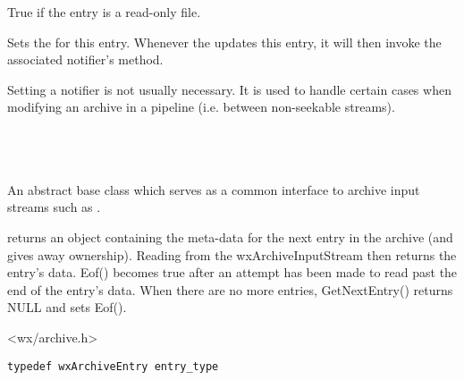 True if the entry is a read-only file.


\label{wxarchiveentrynotifier}



Sets the  for this entry.
Whenever the  updates
this entry, it will then invoke the associated
notifier's 
method.

Setting a notifier is not usually necessary. It is used to handle
certain cases when modifying an archive in a pipeline (i.e. between
non-seekable streams).


\\


%
%

\section{}\label{wxarchiveinputstream}

An abstract base class which serves as a common interface to
archive input streams such as .

 returns an
  object containing the meta-data
for the next entry in the archive (and gives away ownership). Reading from
the wxArchiveInputStream then returns the entry's data. Eof() becomes true
after an attempt has been made to read past the end of the entry's data.
When there are no more entries, GetNextEntry() returns NULL and sets Eof().




<wx/archive.h>

\begin{verbatim}
typedef wxArchiveEntry entry_type
\end{verbatim}

